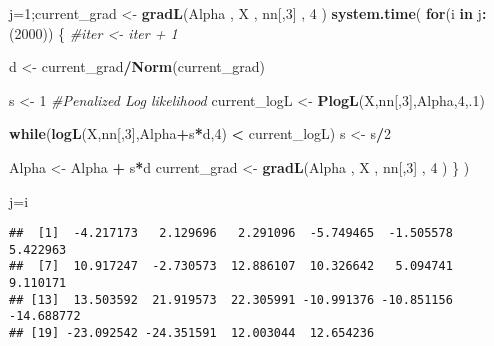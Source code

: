 \documentclass[]{article}
\newenvironment{Shaded}{\begin{snugshade}}{\end{snugshade}}
\newcommand{\KeywordTok}[1]{\textcolor[rgb]{0.13,0.29,0.53}{\textbf{#1}}}
\newcommand{\DecValTok}[1]{\textcolor[rgb]{0.00,0.00,0.81}{#1}}
\newcommand{\StringTok}[1]{\textcolor[rgb]{0.31,0.60,0.02}{#1}}
\newcommand{\CommentTok}[1]{\textcolor[rgb]{0.56,0.35,0.01}{\textit{#1}}}
\newcommand{\ControlFlowTok}[1]{\textcolor[rgb]{0.13,0.29,0.53}{\textbf{#1}}}
\newcommand{\OperatorTok}[1]{\textcolor[rgb]{0.81,0.36,0.00}{\textbf{#1}}}
\newcommand{\NormalTok}[1]{#1}
\begin{document}
\begin{Shaded}
\begin{Highlighting}[]
\NormalTok{j=}\DecValTok{1}\NormalTok{;current_grad <-}\StringTok{ }\KeywordTok{gradL}\NormalTok{(Alpha , X , nn[,}\DecValTok{3}\NormalTok{] , }\DecValTok{4}\NormalTok{ ) }
\KeywordTok{system.time}\NormalTok{(}
 \ControlFlowTok{for}\NormalTok{(i }\ControlFlowTok{in}\NormalTok{ j}\OperatorTok{:}\NormalTok{(}\DecValTok{2000}\NormalTok{)) \{}
    \CommentTok{#iter <- iter + 1}
    
\NormalTok{    d <-}\StringTok{ }\NormalTok{current_grad}\OperatorTok{/}\KeywordTok{Norm}\NormalTok{(current_grad)    }
    
\NormalTok{    s <-}\StringTok{ }\DecValTok{1} 
    \CommentTok{#Penalized Log likelihood}
\NormalTok{    current_logL <-}\StringTok{ }\KeywordTok{PlogL}\NormalTok{(X,nn[,}\DecValTok{3}\NormalTok{],Alpha,}\DecValTok{4}\NormalTok{,.}\DecValTok{1}\NormalTok{)}
    
    \ControlFlowTok{while}\NormalTok{(}\KeywordTok{logL}\NormalTok{(X,nn[,}\DecValTok{3}\NormalTok{],Alpha}\OperatorTok{+}\NormalTok{s}\OperatorTok{*}\NormalTok{d,}\DecValTok{4}\NormalTok{)  }\OperatorTok{<}\StringTok{ }\NormalTok{current_logL)}
\NormalTok{         s <-}\StringTok{ }\NormalTok{s}\OperatorTok{/}\DecValTok{2} 

\NormalTok{    Alpha <-}\StringTok{ }\NormalTok{Alpha }\OperatorTok{+}\StringTok{ }\NormalTok{s}\OperatorTok{*}\NormalTok{d}
\NormalTok{    current_grad <-}\StringTok{  }\KeywordTok{gradL}\NormalTok{(Alpha , X , nn[,}\DecValTok{3}\NormalTok{] , }\DecValTok{4}\NormalTok{ ) \} )}


\NormalTok{j=i}
\end{Highlighting}
\end{Shaded}

\begin{verbatim}
##  [1]  -4.217173   2.129696   2.291096  -5.749465  -1.505578   5.422963
##  [7]  10.917247  -2.730573  12.886107  10.326642   5.094741   9.110171
## [13]  13.503592  21.919573  22.305991 -10.991376 -10.851156 -14.688772
## [19] -23.092542 -24.351591  12.003044  12.654236
\end{verbatim}
\end{document}
